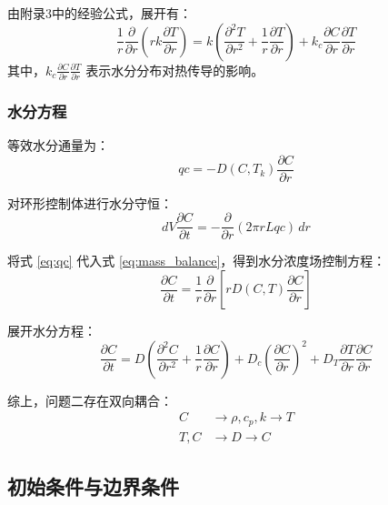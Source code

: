 \documentclass[withoutpreface,bwprint]{cumcm_thesis}
\begin{document}
由附录3中的经验公式，展开有：
\begin{equation}
    \frac{1}{r}\frac{\partial}{\partial r}\left(r k \frac{\partial T}{\partial r}\right) = k\left(\frac{\partial^2 T}{\partial r^2} + \frac{1}{r}\frac{\partial T}{\partial r}\right) + k_c \frac{\partial C}{\partial r} \frac{\partial T}{\partial r}
    \label{eq:temp_expand}
\end{equation}
其中，\(k_c \frac{\partial C}{\partial r} \frac{\partial T}{\partial r}\) 表示水分分布对热传导的影响。

\subsubsection{水分方程}

等效水分通量为：
\begin{equation}
    qc = -D(C, T_k)\frac{\partial C}{\partial r}
    \label{eq:qc}
\end{equation}

对环形控制体进行水分守恒：
\begin{equation}
    dV \frac{\partial C}{\partial t} = -\frac{\partial}{\partial r}(2\pi r L qc) \, dr
    \label{eq:mass_balance}
\end{equation}

将式 \eqref{eq:qc} 代入式 \eqref{eq:mass_balance}，得到水分浓度场控制方程：
\begin{equation}
    \frac{\partial C}{\partial t} = \frac{1}{r}\frac{\partial}{\partial r}\left[r D(C,T) \frac{\partial C}{\partial r}\right]
    \label{eq:moisture_control}
\end{equation}

展开水分方程：
\begin{equation}
    \frac{\partial C}{\partial t} = D\left(\frac{\partial^2 C}{\partial r^2} + \frac{1}{r} \frac{\partial C}{\partial r}\right) + D_c \left(\frac{\partial C}{\partial r}\right)^2 + D_T \frac{\partial T}{\partial r} \frac{\partial C}{\partial r}
    \label{eq:moisture_expand}
\end{equation}

综上，问题二存在双向耦合：
\begin{align*}
    C &\rightarrow \rho, c_p, k \rightarrow T \\
    T, C &\rightarrow D \rightarrow C
\end{align*}

\subsection{初始条件与边界条件}
\end{document}
